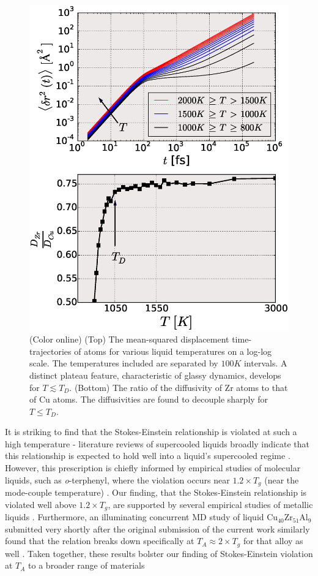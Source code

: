 \documentclass[aps,prl,preprint,showpacs,amsmath,floatfix,superscriptaddress]{revtex4}
\begin{document}
\begin{figure}[t]
\includegraphics[scale=0.43]{MSD_DRatio.eps}
\caption{(Color online) (Top) The mean-squared displacement
time-trajectories of atoms for various liquid temperatures on a
log-log scale. The temperatures included are separated by $100K$
intervals. A distinct plateau feature, characteristic of glassy
dynamics, develops for $T \lesssim T_{D}$. (Bottom) The ratio of
the diffusivity of Zr atoms to that of Cu atoms. The diffusivities
are found to decouple sharply for $T \leq T_{D}$.}
\label{fig:MSD_DRatio}
\end{figure}

It is striking to find that the Stokes-Einstein relationship is
violated at such a high temperature - literature reviews of
supercooled liquids broadly indicate that this relationship is
expected to hold well into a liquid's supercooled regime
\cite{2009Cavagna,Debendetti2001}. However, this prescription is
chiefly informed by empirical studies of molecular liquids, such
as \textit{o}-terphenyl, where the violation occurs near $1.2
\times T_{g}$ (near the mode-couple temperature)
\cite{Mapes2006,Swallen2003}. Our finding, that the
Stokes-Einstein relationship is violated well above $1.2 \times
T_{g}$, are supported by several empirical studies of metallic
liquids \cite{Brillo2011,Brillo2008,Meyer2003}. Furthermore, an
illuminating concurrent MD study of liquid
Cu$_{40}$Zr$_{51}$Al$_{9}$ submitted very shortly after the
original submission of the current work similarly found that the
relation breaks down specifically at $T_{A} \approx 2 \times
T_{g}$ for that alloy as well \cite{egami2015}. Taken together,
these results bolster our finding of Stokes-Einstein violation at
$T_{A}$ to a broader range of materials
\end{document}
